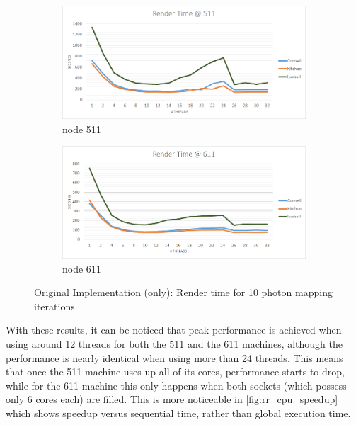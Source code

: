 \documentclass[main.tex]{subfiles}
\begin{document}
\begin{figure}[!htp]
  \centering
  \begin{subfigure}{.5\textwidth}
    \centering
    \includegraphics[width=\linewidth]{excel/rr_cpu_time_511}
    \caption{node 511 \label{fig:rr_cpu_time_511}}
  \end{subfigure}%
  \begin{subfigure}{.5\textwidth}
    \centering
    \includegraphics[width=\linewidth]{excel/rr_cpu_time_611}
    \caption{node 611 \label{fig:rr_cpu_time_611}}
  \end{subfigure}
  \caption{Original Implementation (\cpu only): Render time for 10 photon mapping iterations \label{fig:rr_cpu_time}}
\end{figure}


With these results, it can be noticed that peak performance is achieved when using around 12 \openmp threads for both the 511 and the 611 machines, although the performance is nearly identical when using more than 24 threads. This means that once the 511 machine uses up all of its cores, performance starts to drop, while for the 611 machine this only happens when both sockets (which possess only 6 cores each) are filled. This is more noticeable in \cref{fig:rr_cpu_speedup} which shows speedup versus sequential time, rather than global execution time.
\end{document}
